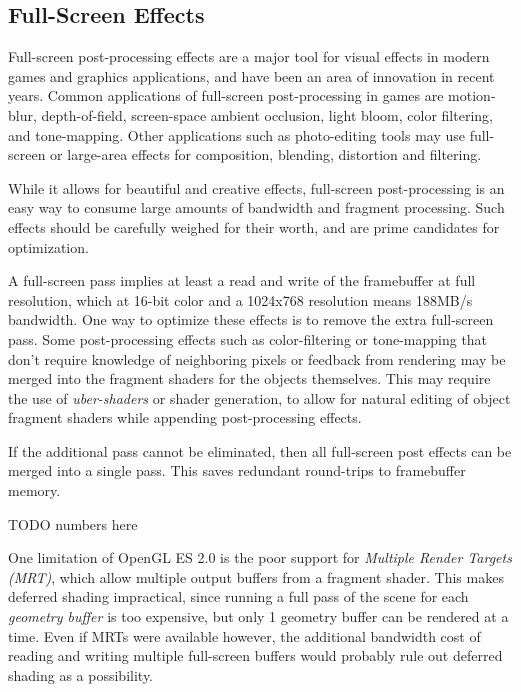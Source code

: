 \subsection {Full-Screen Effects}\label{Jon-McCaffrey-Full-Screen-Effects}
Full-screen post-processing effects are a major tool for visual effects in
modern games and graphics applications, and have been an area of innovation in
recent years.   Common applications of full-screen post-processing in games are
motion-blur, depth-of-field, screen-space ambient occlusion, light bloom, color
filtering, and tone-mapping.  Other applications such as photo-editing tools
may use full-screen or large-area effects for composition, blending, distortion
and filtering.

While it allows for beautiful and creative effects, full-screen post-processing
is an easy way to consume large amounts of bandwidth and fragment processing.
Such effects should be carefully weighed for their worth, and are prime
candidates for optimization.  

A full-screen pass implies at least a read and write of the framebuffer at full
resolution, which at 16-bit color and a 1024x768 resolution means 188MB/s
bandwidth.  One way to optimize these effects is to remove the extra
full-screen pass.  Some post-processing effects such as color-filtering or
tone-mapping that don't require knowledge of neighboring pixels or feedback
from rendering may be merged into the fragment shaders for the objects
themselves.  This may require the use of \textit{uber-shaders} or shader
generation, to allow for natural editing of object fragment shaders while
appending post-processing effects.

If the additional pass cannot be eliminated, then all full-screen post effects can be merged into a single pass.  This saves redundant round-trips to framebuffer memory.

TODO numbers here


One limitation of OpenGL ES 2.0 is the poor support for \textit{Multiple Render
Targets (MRT)}, which allow multiple output buffers from a fragment shader.
This makes deferred shading impractical, since running a full pass of the scene
for each \textit{geometry buffer} is too expensive, but only 1 geometry buffer
can be rendered at a time.  Even if MRTs were available however, the additional
bandwidth cost of reading and writing multiple full-screen buffers would
probably rule out deferred shading as a possibility.

